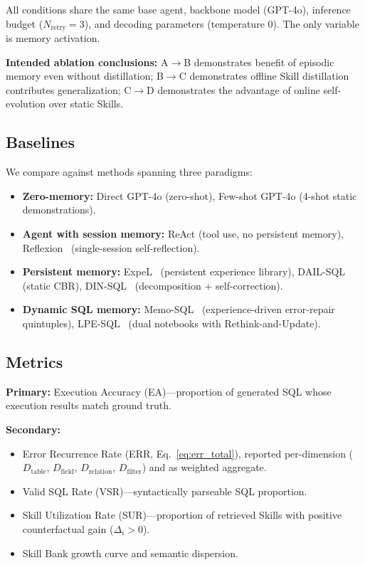 All conditions share the same base agent, backbone model (GPT-4o), inference budget ($N_{\text{retry}}=3$), and decoding parameters (temperature 0). The only variable is memory activation.

\textbf{Intended ablation conclusions:} A$\to$B demonstrates benefit of episodic memory even without distillation; B$\to$C demonstrates offline Skill distillation contributes generalization; C$\to$D demonstrates the advantage of online self-evolution over static Skills.

\subsection{Baselines}
\label{subsec:baselines}

We compare against methods spanning three paradigms:

\begin{itemize}
  \item \textbf{Zero-memory:} Direct GPT-4o (zero-shot), Few-shot GPT-4o (4-shot static demonstrations).
  \item \textbf{Agent with session memory:} ReAct (tool use, no persistent memory), Reflexion~\cite{shinn2023reflexion} (single-session self-reflection).
  \item \textbf{Persistent memory:} ExpeL~\cite{zhao2023expel} (persistent experience library), DAIL-SQL~\cite{gao2024dail} (static CBR), DIN-SQL~\cite{pourreza2023din} (decomposition + self-correction).
  \item \textbf{Dynamic SQL memory:} Memo-SQL~\cite{yang2026memosql} (experience-driven error-repair quintuples), LPE-SQL~\cite{chu2024lpesql} (dual notebooks with Rethink-and-Update).
\end{itemize}

\subsection{Metrics}
\label{subsec:metrics}

\textbf{Primary:} Execution Accuracy (EA)---proportion of generated SQL whose execution results match ground truth.

\textbf{Secondary:}
\begin{itemize}
  \item Error Recurrence Rate (ERR, Eq.~\ref{eq:err_total}), reported per-dimension ($D_{\text{table}}$, $D_{\text{field}}$, $D_{\text{relation}}$, $D_{\text{filter}}$) and as weighted aggregate.
  \item Valid SQL Rate (VSR)---syntactically parseable SQL proportion.
  \item Skill Utilization Rate (SUR)---proportion of retrieved Skills with positive counterfactual gain ($\Delta_i > 0$).
  \item Skill Bank growth curve and semantic dispersion.
\end{itemize}

